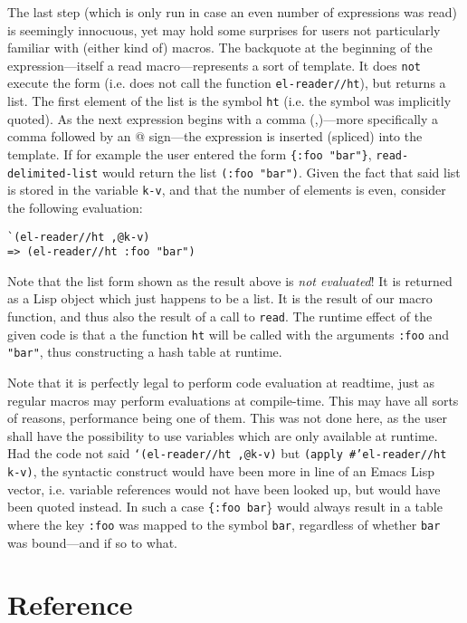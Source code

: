 \documentclass[a4paper,10pt,twoside]{report}
\newcommand{\el}{Emacs Lisp}
\newcommand{\sym}[1]{\texttt{#1}}
\newcommand{\fun}[1]{\texttt{#1}}
\newcommand{\Read}{\fun{read}}
\begin{document}
The last step (which is only run in case an even number of expressions was read)
is seemingly innocuous, yet may hold some surprises for users not particularly
familiar with (either kind of) macros.  The backquote at the beginning of the
expression---itself a read macro---represents a sort of template.  It does
\texttt{not} execute the form (i.e. does not call the function
\fun{el-reader//ht}), but returns a list.  The first element of the list is the
symbol \sym{ht} (i.e. the symbol was implicitly quoted).  As the next
expression begins with a comma (,)---more specifically a comma followed by an @
sign---the expression is inserted (spliced) into the template.  If for example
the user entered the form \texttt{\{:foo "bar"\}}, \fun{read-delimited-list} would
return the list \texttt{(:foo "bar")}.  Given the fact that said list is stored
in the variable \sym{k-v}, and that the number of elements is even, consider the
following evaluation:

\begin{lstlisting}[style=lispinline]
`(el-reader//ht ,@k-v)
=> (el-reader//ht :foo "bar")
\end{lstlisting}

Note that the list form shown as the result above is \emph{not evaluated}!  It
is returned as a Lisp object which just happens to be a list.  It is the result
of our macro function, and thus also the result of a call to \Read{}.  The
runtime effect of the given code is that a the function \fun{ht} will
be called with the arguments \texttt{:foo} and \texttt{"bar"}, thus constructing
a hash table at runtime.

Note that it is perfectly legal to perform code evaluation at readtime, just as
regular macros may perform evaluations at compile-time.  This may have all sorts
of reasons, performance being one of them.  This was not done here, as the user
shall have the possibility to use variables which are only available at runtime.
Had the code not said \texttt{`(el-reader//ht ,@k-v)} but \texttt{(apply
  \#'el-reader//ht k-v)}, the syntactic construct would have been more in line
of an \el{} vector, i.e. variable references would not have been looked up, but
would have been quoted instead.  In such a case \texttt{\{:foo bar}\} would
always result in a table where the key \sym{:foo} was mapped to the symbol
\sym{bar}, regardless of whether \sym{bar} was bound---and if so to what.

\section{Reference}
\label{sec:api-reference}
\end{document}
